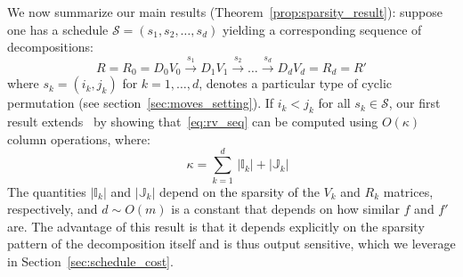 \documentclass[sn-mathphys]{sn-jnl}
\begin{document}
We now summarize our main results  (Theorem~\ref{prop:sparsity_result}): suppose one has a  schedule  $\mathcal{S} = \left( s_1, s_2, \dots, s_d \right)$ yielding a corresponding sequence of decompositions:
  \begin{equation}\label{eq:rv_seq}
   	R = R_0 = D_0 V_0 \overset{s_1}{\to} D_1 V_{1} \overset{s_2}{\to} \dots \overset{s_d}{\to} D_d V_{d} = R_d = R'
 \end{equation}
 where  $s_k = (i_k, j_k)$ for $k=1,\ldots, d$,  denotes a particular type of cyclic permutation (see section~\ref{sec:moves_setting}). If $i_k < j_k$ for all $s_k \in \mathcal{S}$, our first result extends~\cite{busaryev2010tracking} by showing that~\eqref{eq:rv_seq} can be computed  using $O(\kappa)$ column operations, where: 
\begin{equation}
	\quad \kappa = \sum\limits_{k = 1}^d \, \lvert \mathbb{I}_{k}\rvert + \lvert \mathbb{J}_{k}\rvert 
\end{equation}
The quantities $\lvert \mathbb{I}_{k} \rvert$ and $\lvert \mathbb{J}_{k} \rvert$ depend on the sparsity of the $V_k$ and $R_k$ matrices, respectively, and $d \sim O(m)$ is a constant that depends on how similar $f$ and $f'$ are. The advantage of this result is that it depends explicitly on the sparsity pattern of the decomposition itself and is thus output sensitive, which we leverage in Section~\ref{sec:schedule_cost}. 
\end{document}
